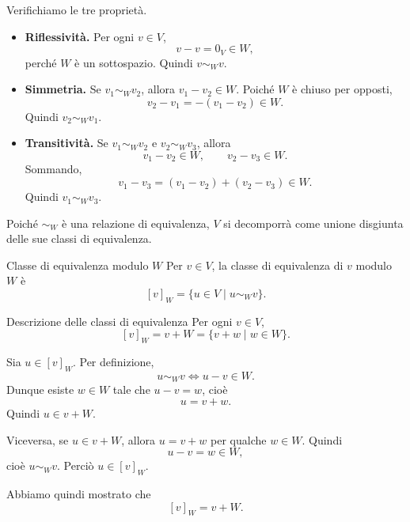 \documentclass[a4paper]{article}
\begin{document}
\begin{radioactive}
\begin{snippetproof}{}
    Verifichiamo le tre proprietà.

    \begin{itemize}
        \item \textbf{Riflessività.}
        Per ogni \(v \in V\),
        \[
            v-v = 0_V \in W,
        \]
        perché \(W\) è un sottospazio. Quindi \(v \sim_W v\).

        \item \textbf{Simmetria.}
        Se \(v_1 \sim_W v_2\), allora \(v_1-v_2 \in W\).
        Poiché \(W\) è chiuso per opposti,
        \[
            v_2-v_1 = -(v_1-v_2) \in W.
        \]
        Quindi \(v_2 \sim_W v_1\).

        \item \textbf{Transitività.}
        Se \(v_1 \sim_W v_2\) e \(v_2 \sim_W v_3\), allora
        \[
            v_1-v_2 \in W,
            \qquad
            v_2-v_3 \in W.
        \]
        Sommando,
        \[
            v_1-v_3 = (v_1-v_2)+(v_2-v_3) \in W.
        \]
        Quindi \(v_1 \sim_W v_3\).
    \end{itemize}
\end{snippetproof}
\end{radioactive}

\begin{radioactive}
Poiché \(\sim_W\) è una relazione di equivalenza, \(V\) si decomporrà come unione disgiunta delle sue classi di equivalenza.
\end{radioactive}

\begin{radioactive}
\begin{snippetdefinition}{Classe di equivalenza modulo \(W\)}
    Per \(v \in V\), la classe di equivalenza di \(v\) modulo \(W\) è
    \[
        [v]_W
        =
        \{u \in V \mid u \sim_W v\}.
    \]
\end{snippetdefinition}
\end{radioactive}

\begin{radioactive}
\begin{snippetproposition}{Descrizione delle classi di equivalenza}
    Per ogni \(v \in V\),
    \[
        [v]_W = v+W = \{v+w \mid w \in W\}.
    \]
\end{snippetproposition}
\end{radioactive}

\begin{radioactive}
\begin{snippetproof}{}
    Sia \(u \in [v]_W\). Per definizione,
    \[
        u \sim_W v
        \iff
        u-v \in W.
    \]
    Dunque esiste \(w \in W\) tale che \(u-v=w\), cioè
    \[
        u = v+w.
    \]
    Quindi \(u \in v+W\).

    Viceversa, se \(u \in v+W\), allora \(u=v+w\) per qualche \(w \in W\).
    Quindi
    \[
        u-v = w \in W,
    \]
    cioè \(u \sim_W v\). Perciò \(u \in [v]_W\).

    Abbiamo quindi mostrato che
    \[
        [v]_W = v+W.
    \]
\end{snippetproof}
\end{radioactive}
\end{document}
